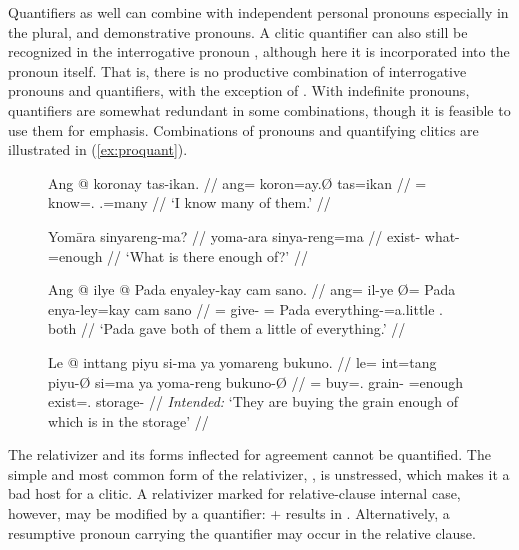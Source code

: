 Quantifiers as well can combine with independent personal pronouns especially
in the plural, and demonstrative pronouns. A clitic quantifier can also still
be recognized in the interrogative pronoun ,
although here it is incorporated into the pronoun itself. That is, there is no
productive combination of interrogative pronouns and quantifiers, with the
exception of . With indefinite pronouns, quantifiers are
somewhat redundant in some combinations, though it is feasible to use them for
emphasis. Combinations of pronouns and quantifying clitics are illustrated in
(\ref{ex:proquant}).

\begin{figure}
\pex\label{ex:proquant}
\a\label{ex:proquant_perspro}\begingl
	\gla Ang @ koronay tas-ikan. //
	\glb ang= koron=ay.Ø tas=ikan //
	\glc \AgtT{}= know=\Fsg{}.\Top{} \TplM{}.\Parg{}=many //
	\glft `I know many of them.' //
\endgl


\a\label{ex:proquant_interpro}\begingl
	\gla Yomāra sinyareng-ma? //
	\glb yoma-ara sinya-reng=ma //
	\glc exist-\TsgI{} what-\AargI{}=enough //
	\glft `What is there enough of?' //
\endgl

\a\label{ex:proquant_indefpro_1}\begingl
	\gla Ang @ ilye {} @ Pada enyaley-kay cam sano. //
	\glb ang= il-ye Ø= Pada enya-ley=kay cam sano //
	\glc \Aarg{}= give-\TsgF{} \Top{}= Pada everything-\PargI{}=a.little 
		\TplM{}.\Dat{} both //
	\glft `Pada gave both of them a little of everything.' //
\endgl


\a\label{ex:proquant_relpro}\ljudge*\begingl
	\gla Le @ inttang piyu si-ma ya yomareng bukuno. //
	\glb le= int=tang piyu-Ø si=ma ya yoma-reng bukuno-Ø //
	\glc \PargI{}= buy=\TplM{}.\Aarg{} grain-\Top{} \Rel{}=enough \LocT{}
	exist=\TsgI{}.\Aarg{} storage-\Top{} //
	\glft \textit{Intended:} `They are buying the grain enough of which is 
		in the storage' //
\endgl

\xe
\end{figure}

The relativizer  and its forms inflected for agreement cannot be
quantified. The simple and most common form of the relativizer, ,
is unstressed, which makes it a bad host for a clitic. A relativizer marked for
relative-clause internal case, however, may be modified by a quantifier:
 +  results in
. Alternatively, a resumptive
pronoun carrying the quantifier may occur in the relative clause.

